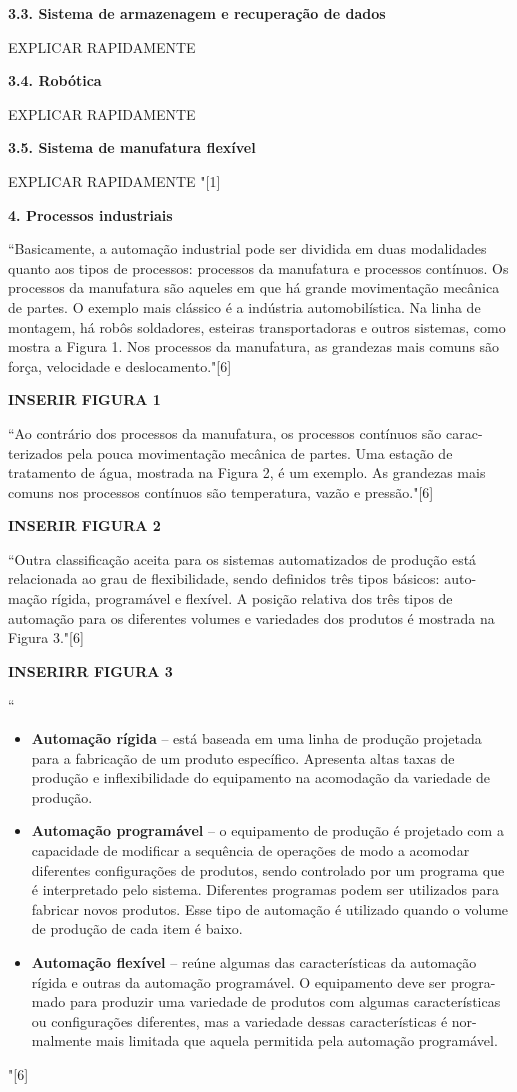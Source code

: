\documentclass[a4paper, 12pt]{article}
\begin{document}
\textbf{3.3. Sistema de armazenagem e recuperação de dados}

EXPLICAR RAPIDAMENTE

\textbf{3.4. Robótica}

EXPLICAR RAPIDAMENTE

\textbf{3.5. Sistema de manufatura flexível}

EXPLICAR RAPIDAMENTE
"[1]

\textbf{4. Processos industriais}

``Basicamente, a automação industrial pode ser dividida em duas modalidades
quanto aos tipos de processos: processos da manufatura e processos contínuos.
Os processos da manufatura são aqueles em que há grande movimentação
mecânica de partes. O exemplo mais clássico é a indústria automobilística. Na
linha de montagem, há robôs soldadores, esteiras transportadoras e outros
sistemas, como mostra a Figura 1. Nos processos da manufatura, as grandezas
mais comuns são força, velocidade e deslocamento."[6]

\textbf{INSERIR FIGURA 1}

``Ao contrário dos processos da manufatura, os processos contínuos são carac-
terizados pela pouca movimentação mecânica de partes. Uma estação de
tratamento de água, mostrada na Figura 2, é um exemplo. As grandezas
mais comuns nos processos contínuos são temperatura, vazão e pressão."[6]

\textbf{INSERIR FIGURA 2}

``Outra classificação aceita para os sistemas automatizados de produção está
relacionada ao grau de flexibilidade, sendo definidos três tipos básicos: auto-
mação rígida, programável e flexível. A posição relativa dos três tipos de
automação para os diferentes volumes e variedades dos produtos é mostrada
na Figura 3."[6]

\textbf{INSERIRR FIGURA 3}

``
\begin{itemize}
	\item \textbf{Automação rígida} – está baseada em uma linha de produção projetada
para a fabricação de um produto específico. Apresenta altas taxas de
produção e inflexibilidade do equipamento na acomodação da variedade
de produção.
	\item \textbf{Automação programável} – o equipamento de produção é projetado com
a capacidade de modificar a sequência de operações de modo a acomodar
diferentes configurações de produtos, sendo controlado por um programa
que é interpretado pelo sistema. Diferentes programas podem ser utilizados
para fabricar novos produtos. Esse tipo de automação é utilizado quando
o volume de produção de cada item é baixo.
	\item \textbf{Automação flexível} – reúne algumas das características da automação
rígida e outras da automação programável. O equipamento deve ser progra-
mado para produzir uma variedade de produtos com algumas características
ou configurações diferentes, mas a variedade dessas características é nor-
malmente mais limitada que aquela permitida pela automação programável.
\end{itemize}
"[6]
\end{document}
